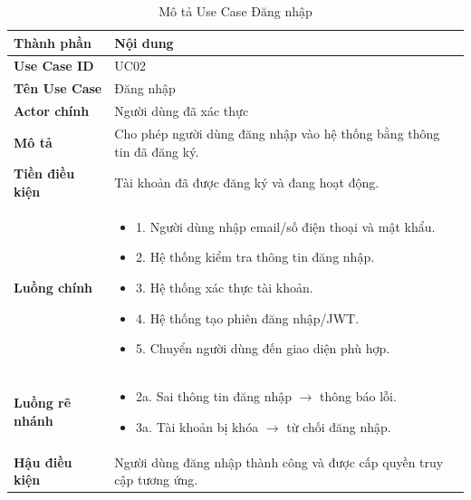 \begin{longtable}{|L{3cm}|L{11cm}|}

\caption{Mô tả Use Case Đăng nhập}
\label{tab:mo-ta-uc02-dang-nhap}
\\
\hline

\textbf{Thành phần} & \textbf{Nội dung} \\
\hline

\textbf{Use Case ID} & UC02 \\
\hline

\textbf{Tên Use Case} & Đăng nhập \\
\hline

\textbf{Actor chính} & Người dùng đã xác thực \\
\hline

\textbf{Mô tả} &
Cho phép người dùng đăng nhập vào hệ thống bằng thông tin đã đăng ký.
\\
\hline

\textbf{Tiền điều kiện} &
Tài khoản đã được đăng ký và đang hoạt động.
\\
\hline

\textbf{Luồng chính} &
\begin{itemize}[leftmargin=*,topsep=2pt,itemsep=2pt]
    \item 1. Người dùng nhập email/số điện thoại và mật khẩu.
    \item 2. Hệ thống kiểm tra thông tin đăng nhập.
    \item 3. Hệ thống xác thực tài khoản.
    \item 4. Hệ thống tạo phiên đăng nhập/JWT.
    \item 5. Chuyển người dùng đến giao diện phù hợp.
\end{itemize}
\\
\hline

\textbf{Luồng rẽ nhánh} &
\begin{itemize}[leftmargin=*,topsep=2pt,itemsep=2pt]
    \item 2a. Sai thông tin đăng nhập $\rightarrow$ thông báo lỗi.
    \item 3a. Tài khoản bị khóa $\rightarrow$ từ chối đăng nhập.
\end{itemize}
\\
\hline

\textbf{Hậu điều kiện} &
Người dùng đăng nhập thành công và được cấp quyền truy cập tương ứng.
\\
\hline

\end{longtable}

